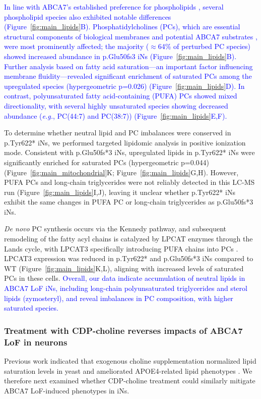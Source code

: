 \newcommand{\quoteB}{\textcolor{blue}{In line with ABCA7's established preference for phospholipids \cite{Tomioka2017-sq,Picataggi2022-hf,Fang2025}, several phospholipid species also exhibited notable differences (Figure~\ref{fig:main_lipids}B). Phosphatidylcholines (PCs), which are essential structural components of biological membranes and potential ABCA7 substrates \cite{LeThiMy2022-dp,Fang2025}, were most prominently affected; the majority ($\approx$64\% of perturbed PC species) showed increased abundance in p.Glu50fs3 iNs (Figure~\ref{fig:main_lipids}B). Further analysis based on fatty acid saturation—an important factor influencing membrane fluidity—revealed significant enrichment of saturated PCs among the upregulated species (hypergeometric p=0.026) (Figure~\ref{fig:main_lipids}D). In contrast, polyunsaturated fatty acid-containing (PUFA) PCs showed mixed directionality, with several highly unsaturated species showing decreased abundance (\textit{e.g.}, PC(44:7) and PC(38:7)) (Figure~\ref{fig:main_lipids}E,F).}}
\quoteB

To determine whether neutral lipid and PC imbalances were conserved in p.Tyr622* iNs, we performed targeted lipidomic analysis in positive ionization mode. Consistent with p.Glu50fs*3 iNs, upregulated lipids in p.Tyr622* iNs were significantly enriched for saturated PCs (hypergeometric p=0.044) (Figure~\ref{fig:main_mitochondrial}K; Figure~\ref{fig:main_lipids}G,H). However, PUFA PCs and long-chain triglycerides were not reliably detected in this LC-MS run (Figure~\ref{fig:main_lipids}I,J), leaving it unclear whether p.Tyr622* iNs exhibit the same changes in PUFA PC or long-chain triglycerides as p.Glu50fs*3 iNs.

\textit{De novo} PC synthesis occurs via the Kennedy pathway, and subsequent remodeling of the fatty acyl chains is catalyzed by LPCAT enzymes through the Lands cycle, with LPCAT3 specifically introducing PUFA chains into PCs \cite{Boumann2003-ew,Wang2019-om,Zhao2008-pq}. LPCAT3 expression was reduced in p.Tyr622* and p.Glu50fs*3 iNs compared to WT (Figure~\ref{fig:main_lipids}K,L), aligning with increased levels of saturated PCs in these cells. \newcommand{\quoteH}{\textcolor{blue}{Overall, our data indicate accumulation of neutral lipids in ABCA7 LoF iNs, including long-chain polyunsaturated triglycerides and sterol lipids (zymosteryl), and reveal imbalances in PC composition, with higher saturated species.\label{quoteH-label}}}
\quoteH

\subsubsection{Treatment with CDP-choline reverses impacts of ABCA7 LoF in neurons}
Previous work indicated that exogenous choline supplementation normalized lipid saturation levels in yeast and ameliorated APOE4-related lipid phenotypes \cite{Boumann2006-nz,Sienski2021-zt}. We therefore next examined whether CDP-choline treatment could similarly mitigate ABCA7 LoF-induced phenotypes in iNs.

